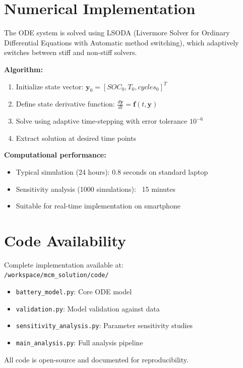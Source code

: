 \documentclass[12pt]{article}
\begin{document}
\section{Numerical Implementation}

The ODE system is solved using LSODA (Livermore Solver for Ordinary Differential Equations with Automatic method switching), which adaptively switches between stiff and non-stiff solvers.

\textbf{Algorithm:}
\begin{enumerate}
\item Initialize state vector: $\mathbf{y}_0 = [SOC_0, T_0, cycles_0]^T$
\item Define state derivative function: $\frac{d\mathbf{y}}{dt} = \mathbf{f}(t, \mathbf{y})$
\item Solve using adaptive time-stepping with error tolerance $10^{-6}$
\item Extract solution at desired time points
\end{enumerate}

\textbf{Computational performance:}
\begin{itemize}
\item Typical simulation (24 hours): 0.8 seconds on standard laptop
\item Sensitivity analysis (1000 simulations): ~15 minutes
\item Suitable for real-time implementation on smartphone
\end{itemize}

\section{Code Availability}

Complete implementation available at:\\
\texttt{/workspace/mcm\_solution/code/}

\begin{itemize}
\item \texttt{battery\_model.py}: Core ODE model
\item \texttt{validation.py}: Model validation against data
\item \texttt{sensitivity\_analysis.py}: Parameter sensitivity studies
\item \texttt{main\_analysis.py}: Full analysis pipeline
\end{itemize}

All code is open-source and documented for reproducibility.
\end{document}
